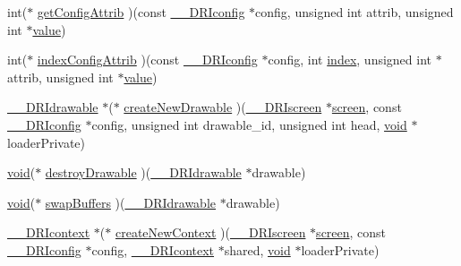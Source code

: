 \begin{DoxyCompactItemize}
int($\ast$ \hyperlink{struct_____d_r_icore_extension_rec_af06eab75defdb8ffe7b61d4cc975ffc3}{get\+Config\+Attrib} )(const \hyperlink{dri__interface_8h_aeac81999efbbf8b1d6886338e3ea24d9}{\+\_\+\+\_\+\+D\+R\+Iconfig} $\ast$config, unsigned int attrib, unsigned int $\ast$\hyperlink{glcorearb_8h_a8ad81492d410ff2ac11f754f4042150f}{value})
\item 
int($\ast$ \hyperlink{struct_____d_r_icore_extension_rec_aa32e6df7cd0c50578903c9dd78aba59e}{index\+Config\+Attrib} )(const \hyperlink{dri__interface_8h_aeac81999efbbf8b1d6886338e3ea24d9}{\+\_\+\+\_\+\+D\+R\+Iconfig} $\ast$config, int \hyperlink{glcorearb_8h_a57f14e05b1900f16a2da82ade47d0c6d}{index}, unsigned int $\ast$attrib, unsigned int $\ast$\hyperlink{glcorearb_8h_a8ad81492d410ff2ac11f754f4042150f}{value})
\item 
\hyperlink{dri__interface_8h_a5bfb832a0a08208d95b3bbef439d2262}{\+\_\+\+\_\+\+D\+R\+Idrawable} $\ast$($\ast$ \hyperlink{struct_____d_r_icore_extension_rec_a335908b0f7bce3aaec55789f40003643}{create\+New\+Drawable} )(\hyperlink{dri__interface_8h_a9961b01d421ee1fd6ed3c05acc9ca561}{\+\_\+\+\_\+\+D\+R\+Iscreen} $\ast$\hyperlink{cad_8h_ae04e09e4e3831bfc1632c509ae37dcec}{screen}, const \hyperlink{dri__interface_8h_aeac81999efbbf8b1d6886338e3ea24d9}{\+\_\+\+\_\+\+D\+R\+Iconfig} $\ast$config, unsigned int drawable\+\_\+id, unsigned int head, \hyperlink{_s_d_l__opengles2__gl2ext_8h_ae5d8fa23ad07c48bb609509eae494c95}{void} $\ast$loader\+Private)
\item 
\hyperlink{_s_d_l__opengles2__gl2ext_8h_ae5d8fa23ad07c48bb609509eae494c95}{void}($\ast$ \hyperlink{struct_____d_r_icore_extension_rec_a3ddbdbe3193d26ea0d60b84dbaf91170}{destroy\+Drawable} )(\hyperlink{dri__interface_8h_a5bfb832a0a08208d95b3bbef439d2262}{\+\_\+\+\_\+\+D\+R\+Idrawable} $\ast$drawable)
\item 
\hyperlink{_s_d_l__opengles2__gl2ext_8h_ae5d8fa23ad07c48bb609509eae494c95}{void}($\ast$ \hyperlink{struct_____d_r_icore_extension_rec_addec4bfd74138870a2ff1a75239e0bc2}{swap\+Buffers} )(\hyperlink{dri__interface_8h_a5bfb832a0a08208d95b3bbef439d2262}{\+\_\+\+\_\+\+D\+R\+Idrawable} $\ast$drawable)
\item 
\hyperlink{dri__interface_8h_a3fd295cba82b5a3d79f1ee7e12bfb908}{\+\_\+\+\_\+\+D\+R\+Icontext} $\ast$($\ast$ \hyperlink{struct_____d_r_icore_extension_rec_ae126058e87a3b74c27f48e275bb28e7b}{create\+New\+Context} )(\hyperlink{dri__interface_8h_a9961b01d421ee1fd6ed3c05acc9ca561}{\+\_\+\+\_\+\+D\+R\+Iscreen} $\ast$\hyperlink{cad_8h_ae04e09e4e3831bfc1632c509ae37dcec}{screen}, const \hyperlink{dri__interface_8h_aeac81999efbbf8b1d6886338e3ea24d9}{\+\_\+\+\_\+\+D\+R\+Iconfig} $\ast$config, \hyperlink{dri__interface_8h_a3fd295cba82b5a3d79f1ee7e12bfb908}{\+\_\+\+\_\+\+D\+R\+Icontext} $\ast$shared, \hyperlink{_s_d_l__opengles2__gl2ext_8h_ae5d8fa23ad07c48bb609509eae494c95}{void} $\ast$loader\+Private)

\end{DoxyCompactItemize}
